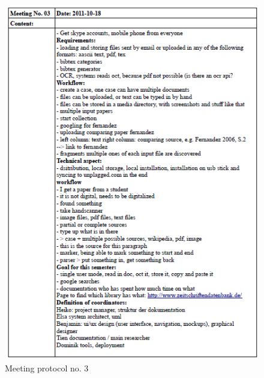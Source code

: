 \begin{appendix}
\begin{figure}
  \centering
    \includegraphics[width=\textwidth]{images/a_meetings/meeting_03.png}
  \caption{Meeting protocol no. 3}
  \label{fig:meeting protocol no. 3}
\end{figure}


\end{appendix}

